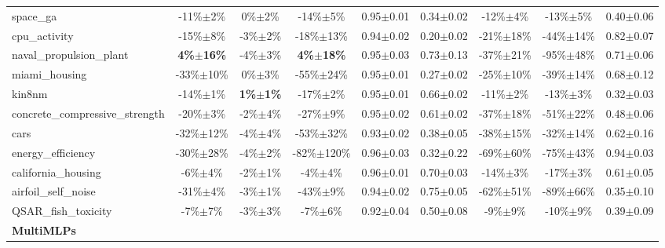 \begin{table}[t]
\begin{small}
\begin{sc}
{\begin{tabular}{lcccccccc}
space\_ga  &  -11\%$\pm$2\%  &  0\%$\pm$2\%  &  -14\%$\pm$5\%  &  0.95$\pm$0.01  &  0.34$\pm$0.02  &  -12\%$\pm$4\%  &  -13\%$\pm$5\%  &  0.40$\pm$0.06 \\
cpu\_activity  &  -15\%$\pm$8\%  &  -3\%$\pm$2\%  &  -18\%$\pm$13\%  &  0.94$\pm$0.02  &  0.20$\pm$0.02  &  -21\%$\pm$18\%  &  -44\%$\pm$14\%  &  0.82$\pm$0.07 \\
naval\_propulsion\_plant  &  \textbf{4\%$\pm$16\%}  &  -4\%$\pm$3\%  &  \textbf{4\%$\pm$18\%}  &  0.95$\pm$0.03  &  0.73$\pm$0.13  &  -37\%$\pm$21\%  &  -95\%$\pm$48\%  &  0.71$\pm$0.06 \\
miami\_housing  &  -33\%$\pm$10\%  &  0\%$\pm$3\%  &  -55\%$\pm$24\%  &  0.95$\pm$0.01  &  0.27$\pm$0.02  &  -25\%$\pm$10\%  &  -39\%$\pm$14\%  &  0.68$\pm$0.12 \\
kin8nm  &  -14\%$\pm$1\%  &  \textbf{1\%$\pm$1\%}  &  -17\%$\pm$2\%  &  0.95$\pm$0.01  &  0.66$\pm$0.02  &  -11\%$\pm$2\%  &  -13\%$\pm$3\%  &  0.32$\pm$0.03 \\
concrete\_compressive\_strength  &  -20\%$\pm$3\%  &  -2\%$\pm$4\%  &  -27\%$\pm$9\%  &  0.95$\pm$0.02  &  0.61$\pm$0.02  &  -37\%$\pm$18\%  &  -51\%$\pm$22\%  &  0.48$\pm$0.06 \\
cars  &  -32\%$\pm$12\%  &  -4\%$\pm$4\%  &  -53\%$\pm$32\%  &  0.93$\pm$0.02  &  0.38$\pm$0.05  &  -38\%$\pm$15\%  &  -32\%$\pm$14\%  &  0.62$\pm$0.16 \\
energy\_efficiency  &  -30\%$\pm$28\%  &  -4\%$\pm$2\%  &  -82\%$\pm$120\%  &  0.96$\pm$0.03  &  0.32$\pm$0.22  &  -69\%$\pm$60\%  &  -75\%$\pm$43\%  &  0.94$\pm$0.03 \\
california\_housing  &  -6\%$\pm$4\%  &  -2\%$\pm$1\%  &  -4\%$\pm$4\%  &  0.96$\pm$0.01  &  0.70$\pm$0.03  &  -14\%$\pm$3\%  &  -17\%$\pm$3\%  &  0.61$\pm$0.05 \\
airfoil\_self\_noise  &  -31\%$\pm$4\%  &  -3\%$\pm$1\%  &  -43\%$\pm$9\%  &  0.94$\pm$0.02  &  0.75$\pm$0.05  &  -62\%$\pm$51\%  &  -89\%$\pm$66\%  &  0.35$\pm$0.10 \\
QSAR\_fish\_toxicity  &  -7\%$\pm$7\%  &  -3\%$\pm$3\%  &  -7\%$\pm$6\%  &  0.92$\pm$0.04  &  0.50$\pm$0.08  &  -9\%$\pm$9\%  &  -10\%$\pm$9\%  &  0.39$\pm$0.09 \\
\cmidrule(lr){1-9}
\textbf{MultiMLPs} & & & & & & & & \\ \cmidrule(lr){1-9}


\end{tabular}}
\end{sc}
\end{small}
\end{table}
